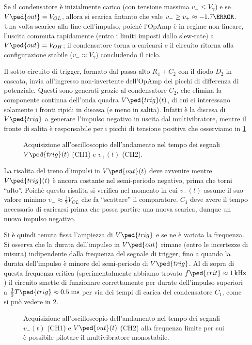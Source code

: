\documentclass[10pt, a4paper, italian]{article}
\begin{document}
Se il condensatore è inizialmente carico (con tensione massima
$v_- \leq V_\gamma$) e se $V\ped{out} = V_{OL}$, allora si scarica fintanto
che vale $v_- \geq v_+ \approx - 1.7 {\V}$. Una volta scarico alla fine
dell'impulso, poiché l'OpAmp è in regime non-lineare, l'uscita commuta
rapidamente (entro i limiti imposti dallo slew-rate) a $V\ped{out} = V_{OH}$;
il condensatore torna a caricarsi e il circuito ritorna alla configurazione
stabile ($v_- \approx V_\gamma$) concludendo il ciclo.

Il sotto-circuito di trigger, formato dal passa-alto $R_4 + C_2$ con il diodo
$D_2$ in cascata, invia all'ingresso non-invertente dell'OpAmp dei picchi di
differenza di potenziale. Questi sono generati grazie al condensatore $C_2$, 
che elimina la componente continua dell'onda quadra $V\ped{trig} (t)$, di cui
ci interessano solamente i fronti ripidi in discesa (e meno in salita).
Infatti è la discesa di $V\ped{trig}$ a generare l'impulso negativo in uscita
dal multivibratore, mentre il fronte di salita è responsabile per i picchi di
tensione positiva che osserviamo in \cref{fig: mstabilev+vtrig}
\begin{figure}[htbp]
	\centering
	\caption{Acquisizione all'oscilloscopio dell'andamento nel tempo dei
	segnali $V\ped{trig} (t)$ (CH1) e $v_+ (t)$ (CH2).
	\label{fig: mstabilev+vtrig}}
\end{figure}

La risalita del treno d'impulsi in $V\ped{out} (t)$ deve avvenire mentre
$V\ped{trig} (t)$ è ancora costante nel semi-periodo negativo, prima che torni
``alto''. Poiché questa risalita si verifica nel momento in cui $v_- (t)$
assume il suo valore minimo $v_- \approx \frac{1}{2} V_{OL}$ che fa
``scattare'' il comparatore, $C_1$ deve avere il tempo necessario di caricarsi
prima che possa partire una nuova scarica, dunque un nuovo impulso negativo.

Si è quindi tenuta fissa l'ampiezza di $V\ped{trig}$ e se ne è variata la
frequenza. Si osserva che la durata dell'impulso in $V\ped{out}$ rimane
(entro le incertezze di misura) indipendente dalla frequenza del segnale di
trigger, fino a quando la durata dell'impulso è minore del semi-periodo di
$V\ped{trig}$. Al di sopra di questa frequenza critica (sperimentalmente
abbiamo trovato $f\ped{crit} \approx \SI{1}{k\hertz}$) il circuito smette di
funzionare correttamente per durate dell'impulso superiori a
$\frac{1}{2} T\ped{trig} \approx 0.5 \; \si{m\s}$ per via dei tempi di carica
del condensatore $C_1$, come si può vedere in \cref{fig: mstabileflim}.
\begin{figure}[htbp]
	\centering
	\caption{Acquisizione all'oscilloscopio dell'andamento nel tempo dei
	segnali $v_- (t)$ (CH1) e $V\ped{out} (t)$ (CH2) alla frequenza limite
	per cui è possibile pilotare il multivibratore monostabile.
	\label{fig: mstabileflim}}
\end{figure}
\end{document}
